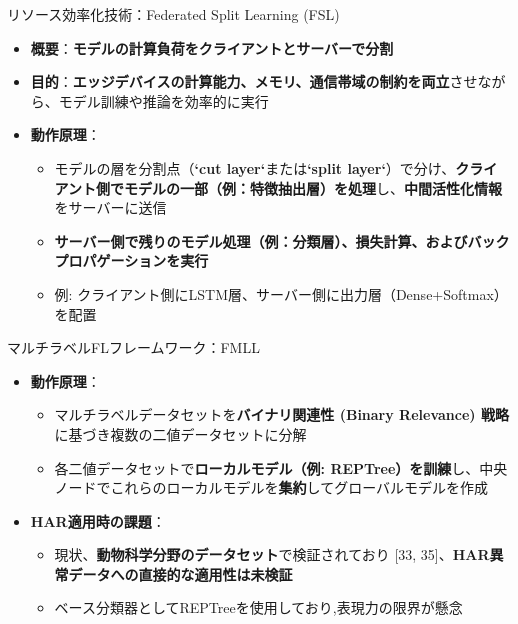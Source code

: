 \documentclass[unicode,12pt,aspectratio=169,dvipdfmx]{beamer}
\begin{document}
\begin{frame}{リソース効率化技術：Federated Split Learning (FSL)\cite{FSL}}
\begin{itemize}
    \item \textbf{概要}：\textbf{モデルの計算負荷をクライアントとサーバーで分割}
    \item \textbf{目的}：\textbf{エッジデバイスの計算能力、メモリ、通信帯域の制約を両立}させながら、モデル訓練や推論を効率的に実行
    \item \textbf{動作原理}：
    \begin{itemize}
        \item モデルの層を分割点（\textbf{`cut layer`}または\textbf{`split layer`}）で分け、\textbf{クライアント側でモデルの一部（例：特徴抽出層）を処理}し、\textbf{中間活性化情報}をサーバーに送信
        \item \textbf{サーバー側で残りのモデル処理（例：分類層）、損失計算、およびバックプロパゲーションを実行}
        \item 例: クライアント側にLSTM層、サーバー側に出力層（Dense+Softmax）を配置
    \end{itemize}
\end{itemize}
\end{frame}

\begin{frame}{マルチラベルFLフレームワーク：FMLL\cite{FMLL}}
\begin{itemize}
    \item \textbf{動作原理}：
    \begin{itemize}
        \item マルチラベルデータセットを\textbf{バイナリ関連性 (Binary Relevance) 戦略}に基づき複数の二値データセットに分解
        \item 各二値データセットで\textbf{ローカルモデル（例: REPTree）を訓練}し、中央ノードでこれらのローカルモデルを\textbf{集約}してグローバルモデルを作成
    \end{itemize}
    \item \textbf{HAR適用時の課題}：
    \begin{itemize}
        \item 現状、\textbf{動物科学分野のデータセット}で検証されており [33, 35]、\textbf{HAR異常データへの直接的な適用性は未検証}
        \item ベース分類器としてREPTreeを使用しており,表現力の限界が懸念
    \end{itemize}
\end{itemize}
\end{frame}
\end{document}
